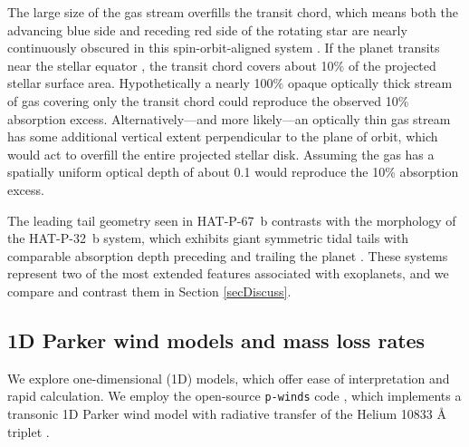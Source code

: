 \documentclass[linenumbers, twocolumn, trackchanges]{aastex631}
\begin{document}
The large size of the gas stream overfills the transit chord, which means both the advancing blue side and receding red side of the rotating star are nearly continuously obscured in this spin-orbit-aligned system \citep{2017AJ....153..211Z}. If the planet transits near the stellar equator \citep{2017AJ....153..211Z}, the transit chord covers about 10$\%$ of the projected stellar surface area.  Hypothetically a nearly 100$\%$ opaque optically thick stream of gas covering only the transit chord could reproduce the observed 10$\%$ absorption excess.  Alternatively---and more likely---an optically thin gas stream has some additional vertical extent perpendicular to the plane of orbit, which would act to overfill the entire projected stellar disk.  Assuming the gas has a spatially uniform optical depth of about 0.1 would reproduce the 10\% absorption excess.

The leading tail geometry seen in HAT-P-67~b contrasts with the morphology of the HAT-P-32~b system, which exhibits giant symmetric tidal tails with comparable absorption depth preceding and trailing the planet \citep{doi:10.1126/sciadv.adf8736}.  These systems represent two of the most extended features associated with exoplanets, and we compare and contrast them in Section \ref{secDiscuss}.


\subsection{1D Parker wind models and mass loss rates}\label{pwinds}
We explore one-dimensional (1D) models, which offer ease of interpretation and rapid calculation.  We employ the open-source \texttt{p-winds} code \citep{2022A&A...659A..62D}, which implements a transonic 1D Parker wind model with radiative transfer of the Helium 10833 \AA~ triplet \citep{2018ApJ...855L..11O,2020A&A...636A..13L}.
\end{document}
